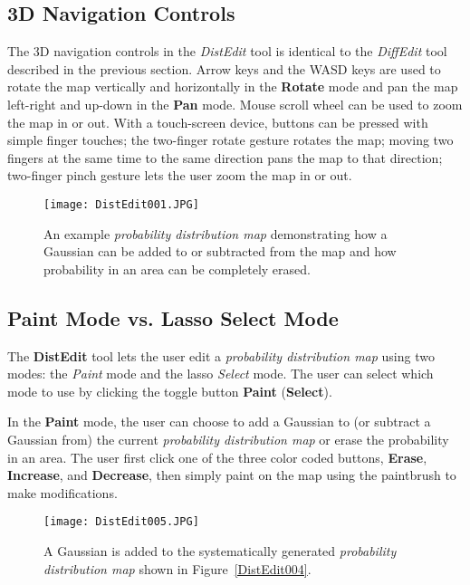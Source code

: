 \subsection{3D Navigation Controls}

The 3D navigation controls in the \textit{DistEdit} tool is identical to the \textit{DiffEdit} tool described in the previous section. Arrow keys and the WASD keys are used to rotate the map vertically and horizontally in the \textbf{Rotate} mode and pan the map left-right and up-down in the \textbf{Pan} mode. Mouse scroll wheel can be used to zoom the map in or out. With a touch-screen device, buttons can be pressed with simple finger touches; the two-finger rotate gesture rotates the map; moving two fingers at the same time to the same direction pans the map to that direction; two-finger pinch gesture lets the user zoom the map in or out.

\begin{figure}
\centering
\texttt{[image: DistEdit001.JPG]}
\caption{An example \textit{probability distribution map} demonstrating how a Gaussian can be added to or subtracted from the map and how probability in an area can be completely erased.}
\label{DistEdit001}
\end{figure}

\subsection{Paint Mode vs. Lasso Select Mode}

The \textbf{DistEdit} tool lets the user edit a \textit{probability distribution map} using two modes: the \textit{Paint} mode and the lasso \textit{Select} mode. The user can select which mode to use by clicking the toggle button \textbf{Paint} (\textbf{Select}). 

In the \textbf{Paint} mode, the user can choose to add a Gaussian to (or subtract a Gaussian from) the current \textit{probability distribution map} or erase the probability in an area. The user first click one of the three color coded buttons, \textbf{Erase}, \textbf{Increase}, and \textbf{Decrease}, then simply paint on the map using the paintbrush to make modifications.

\begin{figure}[!ht]
\centering
\texttt{[image: DistEdit005.JPG]}
\caption{A Gaussian is added to the systematically generated \textit{probability distribution map} shown in Figure~\ref{DistEdit004}.}
\label{DistEdit005}
\end{figure}

